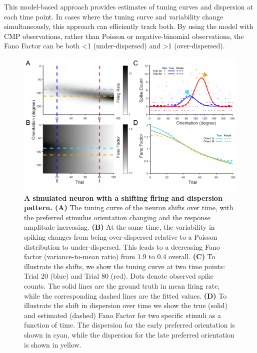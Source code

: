 \documentclass[aoas]{imsart}
\theoremstyle{plain}
\theoremstyle{remark}
\begin{document}
This model-based approach provides estimates of tuning curves and dispersion at each time point. In cases where the tuning curve and variability change simultaneously, this approach can efficiently track both. By using the model with CMP observations, rather than Poisson or negative-binomial observations, the Fano Factor can be both <1 (under-dispersed) and >1 (over-dispersed).

\begin{figure}[h!]
	\centering
	\includegraphics[width=1\textwidth]{figure1.png}
	\caption{\textbf{A simulated neuron with a shifting firing and dispersion pattern. (A)} The tuning curve of the neuron shifts over time, with the preferred stimulus orientation changing and the response amplitude increasing. \textbf{(B)} At the same time, the variability in spiking changes from being over-dispersed relative to a Poisson distribution to under-dispersed. This leads to a decreasing Fano factor (variance-to-mean ratio) from 1.9 to 0.4 overall. \textbf{(C)} To illustrate the shifts, we show the tuning curve at two time points: Trial 20 (blue) and Trial 80 (red). Dots denote observed spike counts. The solid lines are the ground truth in mean firing rate, while the corresponding dashed lines are the fitted values. \textbf{(D)} To illustrate the shift in dispersion over time we show the true (solid) and estimated (dashed) Fano Factor for two specific stimuli as a function of time. The dispersion for the early preferred orientation is shown in cyan, while the dispersion for the late preferred orientation is shown in yellow.}
	\label{fig1}
\end{figure}
\end{document}
